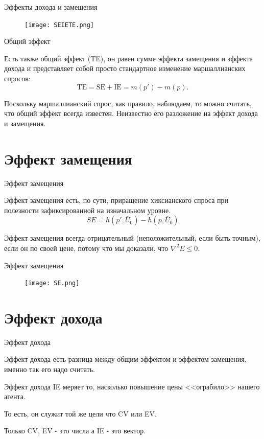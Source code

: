\documentclass{beamer}
\begin{document}
\begin{frame}{Эффекты дохода и замещения}

\begin{figure}[hbt]
\centering
\texttt{[image: SEIETE.png]}
\end{figure}

\end{frame}

\begin{frame}{Общий эффект}

Есть также общий эффект (TE), он равен сумме эффекта замещения и эффекта дохода и представляет собой просто стандартное изменение маршаллианских спросов:
$$ \text{TE} = \text{SE} + \text{IE} = m(p') - m(p).$$

Поскольку маршаллианский спрос, как правило, наблюдаем, то можно считать, что общий эффект всегда известен. Неизвестно его разложение на эффект дохода и замещения.

\end{frame}

\section{Эффект замещения}

\begin{frame}{Эффект замещения}

Эффект замещения есть, по сути, приращение хиксианского спроса при полезности зафиксированной на изначальном уровне. 
$$ SE = h(p', \bar U_0) - h(p, \bar U_0) $$

Эффект замещения всегда отрицательный (неположительный, если быть точным), если он по своей цене, потому что мы доказали, что $\nabla^2 E \leqslant 0$.

\end{frame}

\begin{frame}{Эффект замещения}

\begin{figure}[hbt]
\centering
\texttt{[image: SE.png]}
\end{figure}

\end{frame}

\section{Эффект дохода}

\begin{frame}{Эффект дохода}

Эффект дохода есть разница между общим эффектом и эффектом замещения, именно так его надо считать. 

Эффект дохода IE меряет то, насколько повышение цены <<ограбило>> нашего агента. 

То есть, он служит той же цели что CV или EV. 

Только CV, EV - это числа а IE - это вектор.

\end{frame}
\end{document}
